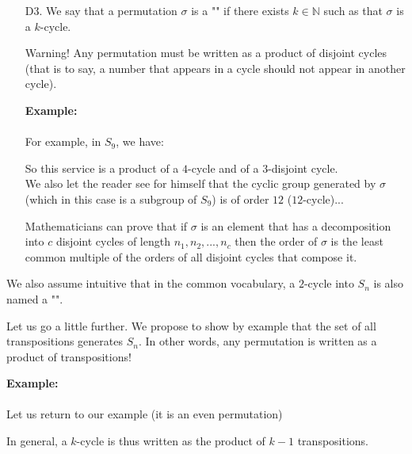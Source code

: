\begin{enumerate}
		\item[D3.] We say that a permutation $\sigma$ is a "" if there exists $k\in \mathbb{N}$ such as that $\sigma$ is a $k$-cycle.
		
		Warning! Any permutation must be written as a product of disjoint cycles (that is to say, a number that appears in a cycle should not appear in another cycle).
		
		\begin{tcolorbox}[colframe=black,colback=white,sharp corners]
		\textbf{{\Large {}}Example:}\\\\
		For example, in $S_9$, we have:
		
		So this service is a product of a $4$-cycle and of a $3$-disjoint cycle.\\
		
		We also let the reader see for himself that the cyclic group generated by $\sigma$ (which in this case is a subgroup of $S_9$) is of order $12$ ($12$-cycle)...
		\end{tcolorbox}
		\begin{tcolorbox}[title=Remark,colframe=black,arc=10pt]
		Mathematicians can prove that if $\sigma$ is an element that has a decomposition into $c$ disjoint cycles of length $n_1,n_2,...,n_c$ then the order of $\sigma$ is the least common multiple of the orders of all disjoint cycles that compose it.
		\end{tcolorbox}	
	\end{enumerate} 
	We also assume intuitive that in the common vocabulary, a $2$-cycle into $S_n$ is also named a "".
	
	Let us go a little further. We propose to show by example that the set of all transpositions generates $S_n$. In other words, any permutation is written as a product of transpositions!
	
	\begin{tcolorbox}[colframe=black,colback=white,sharp corners]
	\textbf{{\Large {}}Example:}\\\\
	Let us return to our example (it is an even permutation)
		
	\end{tcolorbox}
	In general, a $k$-cycle is thus written as the product of $k-1$ transpositions.
	
